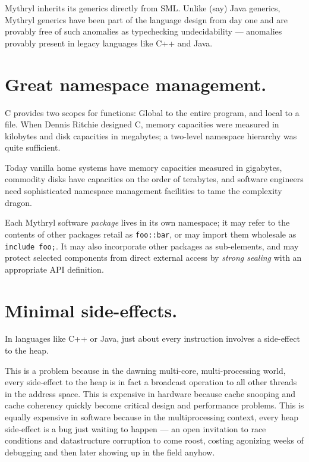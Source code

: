 Mythryl inherits its generics directly from {\sc SML}.  Unlike 
(say) Java generics, Mythryl generics have been part of the language 
design from day one and are provably free of such anomalies as 
typechecking undecidability --- anomalies provably present in legacy 
languages like C++ and Java.



\section{Great namespace management.}

C provides two scopes for functions:  Global to the entire program, 
and local to a file.  When Dennis Ritchie designed C, memory 
capacities were measured in kilobytes and disk capacities in megabytes; 
a two-level namespace hierarchy was quite sufficient.

Today vanilla home systems have memory capacities measured in gigabytes, 
commodity disks have capacities on the order of terabytes, and software engineers 
need sophisticated namespace management facilities to tame the complexity 
dragon.

Each Mythryl software {\em package} lives in its own namespace;  it may 
refer to the contents of other packages retail as {\tt foo::bar}, 
or may import them wholesale as {\tt include foo;}.  It may also 
incorporate other packages as sub-elements, and may protect 
selected components from direct external access by {\em strong sealing} 
with an appropriate {\sc API} definition.


\section{Minimal side-effects.}

In languages like C++ or Java, just about every instruction involves 
a side-effect to the heap.

This is a problem because in the dawning multi-core, multi-processing 
world, every side-effect to the heap is in fact a broadcast operation 
to all other threads in the address space.  This is expensive in hardware 
because cache snooping and cache coherency quickly become critical design 
and performance problems.  This is equally expensive in software because 
in the multiprocessing context, every heap side-effect is a bug just waiting 
to happen --- an open invitation to race conditions and datastructure 
corruption to come roost, costing agonizing weeks of debugging and then 
later showing up in the field anyhow.

